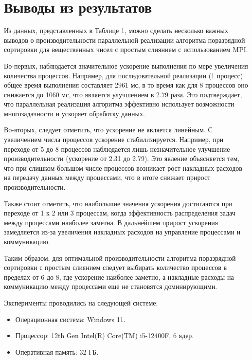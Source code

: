\documentclass[12pt]{article}
\begin{document}
\section{Выводы из результатов}

\hspace*{1.25em}Из данных, представленных в Таблице 1, можно сделать несколько важных выводов о производительности параллельной реализации алгоритма поразрядной сортировки для вещественных чисел с простым слиянием с использованием MPI.

\hspace*{1.25em}Во-первых, наблюдается значительное ускорение выполнения по мере увеличения количества процессов. Например, для последовательной реализации (1 процесс) общее время выполнения составляет 2961 мс, в то время как для 8 процессов оно снижается до 1060 мс, что является улучшением в 2.79 раза. Это подтверждает, что параллельная реализация алгоритма эффективно использует возможности многозадачности и ускоряет обработку данных.

\hspace*{1.25em}Во-вторых, следует отметить, что ускорение не является линейным. С увеличением числа процессов ускорение стабилизируется. Например, при переходе от 5 до 8 процессов наблюдается лишь незначительное улучшение производительности (ускорение от 2.31 до 2.79). Это явление объясняется тем, что при слишком большом числе процессов возникает рост накладных расходов на передачу данных между процессами, что в итоге снижает прирост производительности.

\hspace*{1.25em}Также стоит отметить, что наибольшие значения ускорения достигаются при переходе от 1 к 2 или 3 процессам, когда эффективность распределения задач между процессами наиболее заметна. В дальнейшем прирост ускорения замедляется из-за увеличения накладных расходов на управление процессами и коммуникацию.

\hspace*{1.25em}Таким образом, для оптимальной производительности алгоритма поразрядной сортировки с простым слиянием следует выбирать количество процессов в пределах от 6 до 8, где ускорение наиболее заметно, а накладные расходы на коммуникацию между процессами еще не становятся доминирующими.

Эксперименты проводились на следующей системе:
\begin{itemize}
    \item Операционная система: Windows 11.
    \item Процессор: 12th Gen Intel(R) Core(TM) i5-12400F, 6 ядер.
    \item Оперативная память: 32 ГБ.
\end{itemize}
\end{document}
